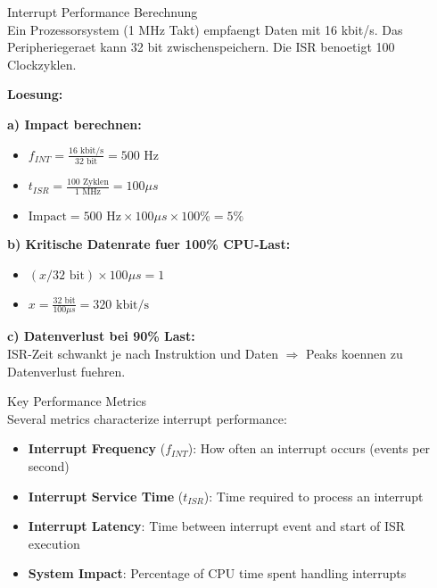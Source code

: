 \begin{example2}{Interrupt Performance Berechnung}\\
    Ein Prozessorsystem (1 MHz Takt) empfaengt Daten mit 16 kbit/s. Das Peripheriegeraet kann 32 bit zwischenspeichern. Die ISR benoetigt 100 Clockzyklen.
    
    \tcblower
    
    \textbf{Loesung:}
    
    \textbf{a) Impact berechnen:}
    \begin{itemize}
        \item $f_{INT} = \frac{16 \text{ kbit/s}}{32 \text{ bit}} = 500 \text{ Hz}$
        \item $t_{ISR} = \frac{100 \text{ Zyklen}}{1 \text{ MHz}} = 100 \mu s$
        \item $\text{Impact} = 500 \text{ Hz} \times 100 \mu s \times 100\% = 5\%$
    \end{itemize}
    
    \textbf{b) Kritische Datenrate fuer 100\% CPU-Last:}
    \begin{itemize}
        \item $(x / 32 \text{ bit}) \times 100 \mu s = 1$
        \item $x = \frac{32 \text{ bit}}{100 \mu s} = 320 \text{ kbit/s}$
    \end{itemize}
    
    \textbf{c) Datenverlust bei 90\% Last:}
    \\ ISR-Zeit schwankt je nach Instruktion und Daten $\Rightarrow$ Peaks koennen zu Datenverlust fuehren.
\end{example2}


\begin{definition}{Key Performance Metrics}\\
Several metrics characterize interrupt performance:
\begin{itemize}
    \item \textbf{Interrupt Frequency} ($f_{INT}$): How often an interrupt occurs (events per second)
    \item \textbf{Interrupt Service Time} ($t_{ISR}$): Time required to process an interrupt
    \item \textbf{Interrupt Latency}: Time between interrupt event and start of ISR execution
    \item \textbf{System Impact}: Percentage of CPU time spent handling interrupts
\end{itemize}
\end{definition}

